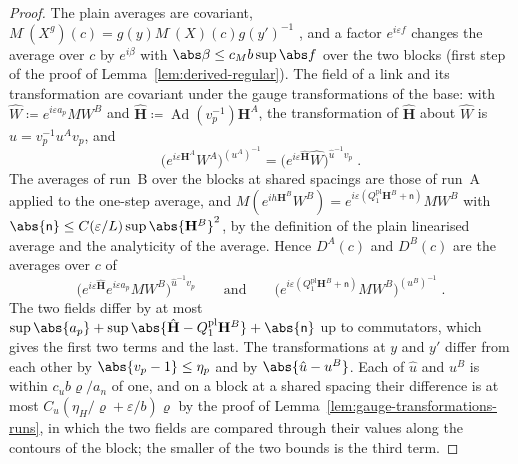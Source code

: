 \begin{proof}
The plain averages are covariant, $M^\cdot(X^g)(c) = g(y)M^\cdot(X)(c)g(y')^{-1}$ \cite[(1.13), p.~78]{BalabanREG}, and a factor $e^{i\varepsilon f}$ changes the average over $c$ by $e^{i\beta}$ with $\abs\beta \leq c_Mb\sup\abs f$ over the two blocks (first step of the proof of Lemma~\ref{lem:derived-regular}). The field of a link and its transformation are covariant under the gauge transformations of the base: with $\hat W \coloneqq e^{i\varepsilon a_p}MW^B$ and $\hat{\mathbf H} \coloneqq \operatorname{Ad}(v_p^{-1})\mathbf H^A$, the transformation \cite[(106)]{BalabanAVG} of $\hat{\mathbf H}$ about $\hat W$ is $\hat u = v_p^{-1}u^Av_p$, and
\[
    \bigl(e^{i\varepsilon\mathbf H^A}W^A\bigr)^{(u^A)^{-1}} = \bigl(e^{i\varepsilon\hat{\mathbf H}}\hat W\bigr)^{\hat u^{-1}v_p}\;.
\]
The averages of run~B over the blocks at shared spacings are those of run~A applied to the one-step average, and $M(e^{ih\mathbf H^B}W^B) = e^{i\varepsilon(Q^{\mathrm{pl}}_1\mathbf H^B + \mathsf n)}MW^B$ with $\abs{\mathsf n} \leq C(\varepsilon/L)\sup\abs{\mathbf H^B}^2$, by the definition of the plain linearised average and the analyticity of the average. Hence $D^A(c)$ and $D^B(c)$ are the averages over $c$ of
\[
    \bigl(e^{i\varepsilon\hat{\mathbf H}}e^{i\varepsilon a_p}MW^B\bigr)^{\hat u^{-1}v_p}
    \qquad\text{and}\qquad
    \bigl(e^{i\varepsilon(Q^{\mathrm{pl}}_1\mathbf H^B + \mathsf n)}MW^B\bigr)^{(u^B)^{-1}}\;.
\]
The two fields differ by at most $\sup\abs{a_p} + \sup\abs{\hat{\mathbf H} - Q^{\mathrm{pl}}_1\mathbf H^B} + \abs{\mathsf n}$ up to commutators, which gives the first two terms and the last. The transformations at $y$ and $y'$ differ from each other by $\abs{v_p - 1} \leq \eta_p$ and by $\abs{\hat u - u^B}$. Each of $\hat u$ and $u^B$ is within $c_ub\varrho/a_n$ of one, and on a block at a shared spacing their difference is at most $C_u(\eta_H/\varrho + \varepsilon/b)\varrho$ by the proof of Lemma~\ref{lem:gauge-transformations-runs}, in which the two fields are compared through their values along the contours of the block; the smaller of the two bounds is the third term.
\end{proof}


